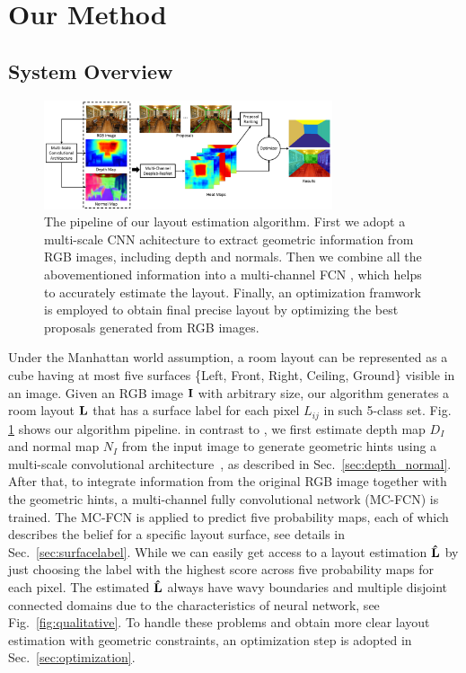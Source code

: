 \section{Our Method}
\label{sec:Meth}


\subsection{System Overview}
\label{subsection:overview}

\begin{figure}[!ht]
	\centering
	\includegraphics[width=8.5cm]{figure/ppline.png}
	\caption{The pipeline of our layout estimation algorithm. First we adopt a multi-scale CNN achitecture \cite{eigen2015predicting} to extract geometric information from RGB images, including depth and normals. Then we combine all the abovementioned information into a multi-channel FCN , which helps to accurately estimate the layout. Finally, an optimization framwork is employed to obtain final precise layout by optimizing the best proposals generated from RGB images.}
	\label{fig:pipeline}
\end{figure}

Under the Manhattan world assumption, a room layout can be represented as a cube having at most five surfaces \{Left, Front, Right, Ceiling, Ground\} visible in an image. 
%
Given an RGB image $\mathbf{I}$ with arbitrary size, our algorithm generates a room layout $\mathbf{L}$ that has a surface label for each pixel $L_{ij} $ in such 5-class set. Fig. \ref{fig:pipeline} shows our algorithm pipeline. 
in contrast to \cite{dasgupta2016delay,ren2016coarse}, we first estimate depth map $D_{I}$ and normal map $N_{I}$ from the input image to generate geometric hints using a multi-scale convolutional architecture~\cite{eigen2015predicting}, as described in Sec.~\ref{sec:depth_normal}.
After that, to integrate information from the original RGB image together with the geometric hints, a multi-channel fully convolutional network (MC-FCN) is trained. The MC-FCN is applied to predict five probability maps, each of which describes the belief for a specific layout surface, see details in Sec.~\ref{sec:surfacelabel}.
While we can easily get access to a layout estimation $\mathbf{\hat{L}}$ by just choosing the label with the highest score across five probability maps for each pixel. 
The estimated $\mathbf{\hat{L}}$ always have wavy boundaries and multiple disjoint connected domains due to the characteristics of neural network, see Fig.~\ref{fig:qualitative}. To handle these problems and obtain more clear layout estimation with geometric constraints, an optimization step is adopted in Sec.~\ref{sec:optimization}.  
 

